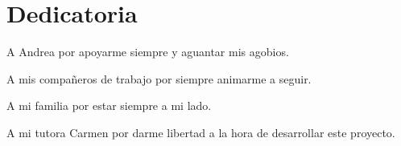 \documentclass[12pt]{report} %
\begin{document}
\newpage %
\thispagestyle{empty}
\mbox{}

\chapter*{Dedicatoria}

\setcounter{page}{3}

A Andrea por apoyarme siempre y aguantar mis agobios. 

A mis compañeros de trabajo por siempre animarme a seguir.

A mi familia por estar siempre a mi lado.

A mi tutora Carmen por darme libertad a la hora de desarrollar este proyecto.

\vfill

\newpage %
\thispagestyle{empty}
\mbox{}
\end{document}
